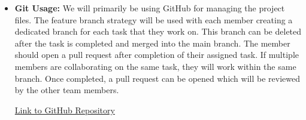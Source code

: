 \documentclass{article}
\begin{document}
\begin{itemize}

    \item \textbf{Git Usage:} We will primarily be using GitHub for managing the project files.
          The feature branch strategy will be used with each member creating a dedicated branch for each task that they work on.
          This branch can be deleted after the task is completed and merged into the main branch.
          The member should open a pull request after completion of their assigned task. If
          multiple members are collaborating on the same task, they will work within the same branch. Once completed,
          a pull request can be opened which will be reviewed by the other team members.

          \href{https://github.com/Ayushpatel2026/Keystone}{Link to GitHub Repository}


\end{itemize}
\end{document}
